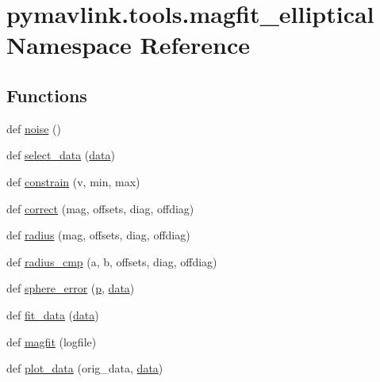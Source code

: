 \hypertarget{namespacepymavlink_1_1tools_1_1magfit__elliptical}{}\section{pymavlink.\+tools.\+magfit\+\_\+elliptical Namespace Reference}
\label{namespacepymavlink_1_1tools_1_1magfit__elliptical}
\subsection*{Functions}
\begin{DoxyCompactItemize}
\item 
def \mbox{\hyperlink{namespacepymavlink_1_1tools_1_1magfit__elliptical_a739fa4369b4770e3c0d3397590f468f2}{noise}} ()
\item 
def \mbox{\hyperlink{namespacepymavlink_1_1tools_1_1magfit__elliptical_aee3a351a012aa1e67eb9de0407ef7830}{select\+\_\+data}} (\mbox{\hyperlink{structdata}{data}})
\item 
def \mbox{\hyperlink{namespacepymavlink_1_1tools_1_1magfit__elliptical_a400fcffd87709a20566085cd6bf5bc25}{constrain}} (v, min, max)
\item 
def \mbox{\hyperlink{namespacepymavlink_1_1tools_1_1magfit__elliptical_a20fabb2795bcf794156ea4dcd0de400a}{correct}} (mag, offsets, diag, offdiag)
\item 
def \mbox{\hyperlink{namespacepymavlink_1_1tools_1_1magfit__elliptical_ad64337f0e7fad08ebdde9d99930c0c4b}{radius}} (mag, offsets, diag, offdiag)
\item 
def \mbox{\hyperlink{namespacepymavlink_1_1tools_1_1magfit__elliptical_a103d997042a9a3703cb39c2a9ae8cbf2}{radius\+\_\+cmp}} (a, b, offsets, diag, offdiag)
\item 
def \mbox{\hyperlink{namespacepymavlink_1_1tools_1_1magfit__elliptical_a4200efcc23a749e0d97aa8750c3cced9}{sphere\+\_\+error}} (\mbox{\hyperlink{velTest_8cpp_a739e18b8b6d072d434ebcb6ca486abb0}{p}}, \mbox{\hyperlink{structdata}{data}})
\item 
def \mbox{\hyperlink{namespacepymavlink_1_1tools_1_1magfit__elliptical_a49f681dd9fd38c70a2fae3c88a9456a6}{fit\+\_\+data}} (\mbox{\hyperlink{structdata}{data}})
\item 
def \mbox{\hyperlink{namespacepymavlink_1_1tools_1_1magfit__elliptical_a28ed55d76fd1e8ca62265a0001d3138c}{magfit}} (logfile)
\item 
def \mbox{\hyperlink{namespacepymavlink_1_1tools_1_1magfit__elliptical_a2a617907e38315cd4da32635d1a9805b}{plot\+\_\+data}} (orig\+\_\+data, \mbox{\hyperlink{structdata}{data}})
\end{DoxyCompactItemize}
